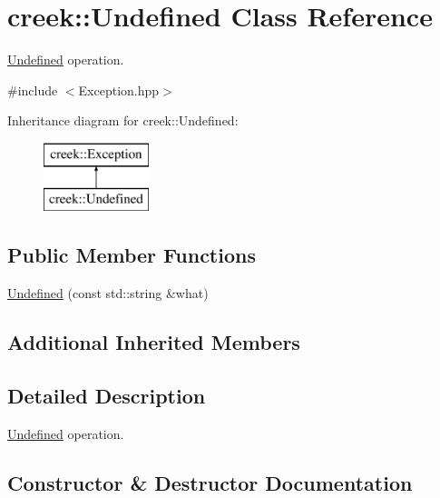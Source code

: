 \hypertarget{classcreek_1_1_undefined}{}\section{creek\+:\+:Undefined Class Reference}
\label{classcreek_1_1_undefined}


\hyperlink{classcreek_1_1_undefined}{Undefined} operation.  




{\ttfamily \#include $<$Exception.\+hpp$>$}

Inheritance diagram for creek\+:\+:Undefined\+:\begin{figure}[H]
\begin{center}
\leavevmode
\includegraphics[height=2.000000cm]{classcreek_1_1_undefined}
\end{center}
\end{figure}
\subsection*{Public Member Functions}
\begin{DoxyCompactItemize}
\item 
\hyperlink{classcreek_1_1_undefined_a6614866b8d3912a3b26f7a3f0034c0ee}{Undefined} (const std\+::string \&what)
\end{DoxyCompactItemize}
\subsection*{Additional Inherited Members}


\subsection{Detailed Description}
\hyperlink{classcreek_1_1_undefined}{Undefined} operation. 

\subsection{Constructor \& Destructor Documentation}
